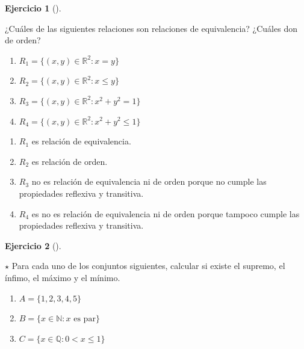 \documentclass[
  spanish,
  a4paper,
]{scrreport}
\providecommand{\tightlist}{%
  \setlength{\itemsep}{0pt}\setlength{\parskip}{0pt}}
\theoremstyle{definition}
\newtheorem{exercise}{Ejercicio}[chapter]
\theoremstyle{remark}
\begin{document}
\begin{exercise}[]\protect\hypertarget{exr-relaciones-equivalencia}{}\label{exr-relaciones-equivalencia}

¿Cuáles de las siguientes relaciones son relaciones de equivalencia?
¿Cuáles don de orden?

\begin{enumerate}
\def\labelenumi{\alph{enumi}.}
\tightlist
\item
  \(R_1=\{(x,y)\in \mathbb{R}^2: x = y\}\)
\item
  \(R_2=\{(x,y)\in \mathbb{R}^2: x\leq y\}\)
\item
  \(R_3=\{(x,y)\in \mathbb{R}^2: x^2 + y^2 = 1\}\)
\item
  \(R_4=\{(x,y)\in \mathbb{R}^2: x^2 + y^2 \leq 1\}\)
\end{enumerate}

\end{exercise}

\begin{tcolorbox}[enhanced jigsaw, arc=.35mm, bottomrule=.15mm, bottomtitle=1mm, breakable, colback=white, colbacktitle=quarto-callout-tip-color!10!white, colframe=quarto-callout-tip-color-frame, coltitle=black, left=2mm, leftrule=.75mm, opacityback=0, opacitybacktitle=0.6, rightrule=.15mm, title=\textcolor{quarto-callout-tip-color}{\faLightbulb}\hspace{0.5em}{Solución}, titlerule=0mm, toprule=.15mm, toptitle=1mm]

\begin{enumerate}
\def\labelenumi{\alph{enumi}.}
\tightlist
\item
  \(R_1\) es relación de equivalencia.
\item
  \(R_2\) es relación de orden.
\item
  \(R_3\) no es relación de equivalencia ni de orden porque no cumple
  las propiedades reflexiva y transitiva.
\item
  \(R_4\) es no es relación de equivalencia ni de orden porque tampoco
  cumple las propiedades reflexiva y transitiva.
\end{enumerate}

\end{tcolorbox}

\begin{exercise}[]\protect\hypertarget{exr-supremo-infimo-maximo-minimo}{}\label{exr-supremo-infimo-maximo-minimo}

\(\star\) Para cada uno de los conjuntos siguientes, calcular si existe
el supremo, el ínfimo, el máximo y el mínimo.

\begin{enumerate}
\def\labelenumi{\alph{enumi}.}
\tightlist
\item
  \(A=\{1, 2, 3, 4, 5\}\)
\item
  \(B=\{x\in\mathbb{N} : x \mbox{ es par}\}\)
\item
  \(C=\{x\in\mathbb{Q} : 0< x \leq 1\}\)
\end{enumerate}

\end{exercise}
\end{document}
